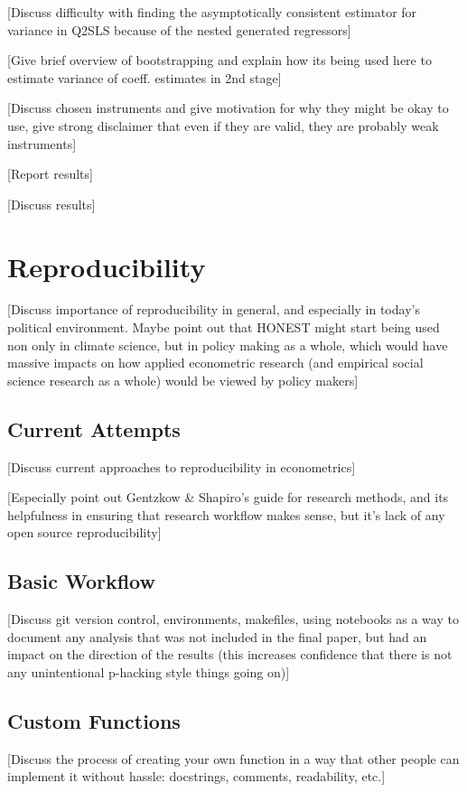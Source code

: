 \documentclass[12pt]{article}
\begin{document}
\textcolor{BrickRed}{[Discuss difficulty with finding the asymptotically consistent estimator for variance in Q2SLS because of the nested generated regressors]}

\textcolor{BrickRed}{[Give brief overview of bootstrapping and explain how its being used here to estimate variance of coeff. estimates in 2nd stage]}

\textcolor{BrickRed}{[Discuss chosen instruments and give motivation for why they might be okay to use, give strong disclaimer that even if they are valid, they are probably weak instruments]}

\textcolor{BrickRed}{[Report results]}

\textcolor{BrickRed}{[Discuss results]}


\newpage
\section{Reproducibility}
\textcolor{BrickRed}{[Discuss importance of reproducibility in general, and especially in today's political environment. Maybe point out that HONEST might start being used non only in climate science, but in policy making as a whole, which would have massive impacts on how applied econometric research (and empirical social science research as a whole) would be viewed by policy makers]}

\subsection{Current Attempts}
\textcolor{BrickRed}{[Discuss current approaches to reproducibility in econometrics]}

\textcolor{BrickRed}{[Especially point out Gentzkow \& Shapiro's guide for research methods, and its helpfulness in ensuring that research workflow makes sense, but it's lack of any open source reproducibility]}

\subsection{Basic Workflow}
\textcolor{BrickRed}{[Discuss git version control, environments, makefiles, using notebooks as a way to document any analysis that was not included in the final paper, but had an impact on the direction of the results (this increases confidence that there is not any unintentional p-hacking style things going on)]}

\subsection{Custom Functions}
\textcolor{BrickRed}{[Discuss the process of creating your own function in  a way that other people can implement it without hassle: docstrings, comments, readability, etc.]}
\end{document}
